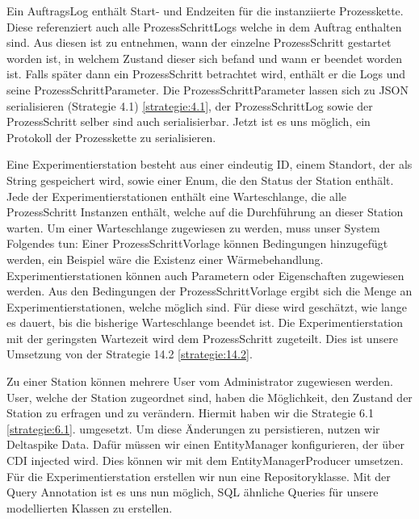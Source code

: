 \documentclass[enabledeprecatedfontcommands,fontsize=12pt,paper=a4,twoside]{scrartcl}
\begin{document}
{Ein AuftragsLog enthält Start- und Endzeiten für die instanziierte Prozesskette.
Diese referenziert auch alle ProzessSchrittLogs welche in dem Auftrag enthalten
sind. Aus diesen ist zu entnehmen, wann der einzelne ProzessSchritt gestartet
worden ist, in welchem Zustand dieser sich befand und wann er beendet worden
ist. Falls später dann ein ProzessSchritt betrachtet wird, enthält er die Logs
und seine ProzessSchrittParameter. Die ProzessSchrittParameter lassen sich zu
JSON serialisieren (Strategie 4.1) \ref{strategie:4.1}, der ProzessSchrittLog sowie der ProzessSchritt
selber sind auch serialisierbar. Jetzt ist es uns möglich, ein Protokoll
der Prozesskette zu serialisieren.


Eine Experimentierstation besteht aus einer eindeutig ID, einem Standort, der
als String gespeichert wird, sowie einer Enum, die den Status der Station
enthält. Jede der Experimentierstationen enthält eine Warteschlange, die alle
ProzessSchritt Instanzen enthält, welche auf die Durchführung an dieser Station
warten. Um einer Warteschlange zugewiesen zu werden, muss unser System
Folgendes tun: Einer ProzessSchrittVorlage können Bedingungen hinzugefügt werden,
ein Beispiel wäre die Existenz einer Wärmebehandlung. Experimentierstationen
können auch Parametern oder Eigenschaften zugewiesen werden.
Aus den Bedingungen der ProzessSchrittVorlage ergibt sich die Menge an
Experimentierstationen, welche möglich sind. Für diese wird geschätzt, wie lange
es dauert, bis die bisherige Warteschlange beendet ist. Die Experimentierstation
mit der geringsten Wartezeit wird dem ProzessSchritt zugeteilt. Dies ist unsere
Umsetzung von der Strategie 14.2 \ref{strategie:14.2}.

Zu einer Station können mehrere User vom Administrator zugewiesen
werden. User, welche der Station zugeordnet sind, haben die Möglichkeit, den
Zustand der Station zu erfragen und zu verändern. Hiermit haben wir die Strategie 6.1 \ref{strategie:6.1}.
umgesetzt. Um diese Änderungen zu persistieren, nutzen wir Deltaspike Data. Dafür
müssen wir einen EntityManager konfigurieren, der über CDI injected wird. Dies
können wir mit dem EntityManagerProducer umsetzen. Für die Experimentierstation
erstellen wir nun eine Repositoryklasse. Mit der Query Annotation ist es uns
nun möglich, SQL ähnliche Queries für unsere modellierten Klassen zu erstellen.

}
\end{document}
